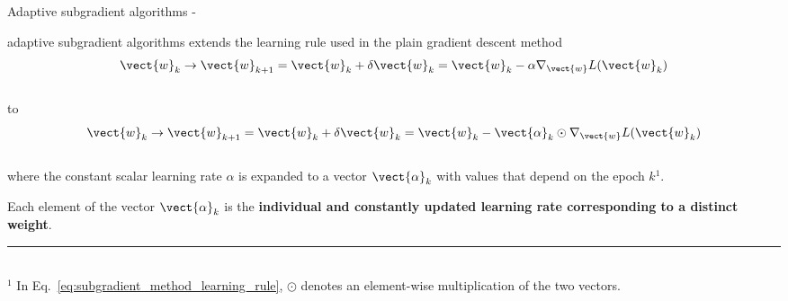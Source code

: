 \begin{frame}[t,allowframebreaks]{
    Adaptive subgradient algorithms -}
    \framebreak
 
    \Gls{adaptive subgradient} algorithms
    extends the learning rule used in 
    the plain gradient descent method
    \begin{equation}
        \vect{w}_{k} \rightarrow \vect{w}_{k+1} = 
        \vect{w}_{k} + \delta \vect{w}_{k} =
        \vect{w}_{k} - \alpha \nabla_{\vect{w}} L(\vect{w}_{k})
    \end{equation}\\
    to
    \begin{equation}
        \vect{w}_{k} \rightarrow \vect{w}_{k+1} = 
        \vect{w}_{k} + \delta \vect{w}_{k} =
        \vect{w}_{k} - \vect{\alpha}_{k} \odot \nabla_{\vect{w}} L(\vect{w}_{k})
        \label{eq:subgradient_method_learning_rule}
    \end{equation}\\
    where
    the constant scalar \gls{learning rate} $\alpha$ 
    is expanded to a vector $\vect{\alpha}_{k}$ 
    with values that depend on the epoch $k$$^1$.\\

    \vspace{0.2cm}

    Each element of the vector $\vect{\alpha}_{k}$ is the 
    {\bf individual and constantly updated \gls{learning rate} 
    corresponding to a distinct weight}.\\
     
    \vspace{0.2cm}
    \noindent\rule{4cm}{0.4pt}\\
    {\small
        $^1$ In Eq.~\ref{eq:subgradient_method_learning_rule}, $\odot$ denotes
        an element-wise multiplication of the two vectors.\\
    }

\end{frame}

